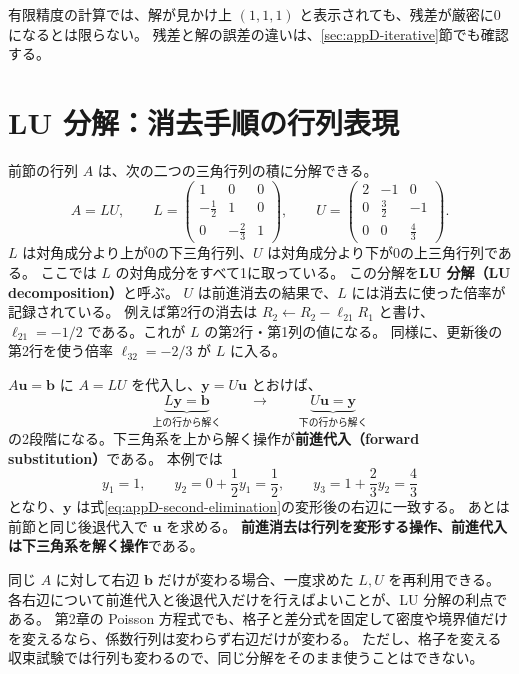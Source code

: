有限精度の計算では、解が見かけ上 $(1,1,1)$ と表示されても、残差が厳密に0になるとは限らない。
残差と解の誤差の違いは、\ref{sec:appD-iterative}節でも確認する。

\section{LU 分解：消去手順の行列表現}
\label{sec:appD-lu}

前節の行列 $A$ は、次の二つの三角行列の積に分解できる。
\begin{equation}
 \boxed{A=LU},\qquad
 L=\begin{pmatrix}1&0&0\\-\frac12&1&0\\0&-\frac23&1\end{pmatrix},\qquad
 U=\begin{pmatrix}2&-1&0\\0&\frac32&-1\\0&0&\frac43\end{pmatrix}.
\label{eq:appD-lu}
\end{equation}
$L$ は対角成分より上が0の下三角行列、$U$ は対角成分より下が0の上三角行列である。
ここでは $L$ の対角成分をすべて1に取っている。
この分解を\textbf{LU 分解（LU decomposition）}と呼ぶ。
$U$ は前進消去の結果で、$L$ には消去に使った倍率が記録されている。
例えば第2行の消去は $R_2\leftarrow R_2-\ell_{21}R_1$ と書け、
$\ell_{21}=-1/2$ である。これが $L$ の第2行・第1列の値になる。
同様に、更新後の第2行を使う倍率 $\ell_{32}=-2/3$ が $L$ に入る。

$A\boldsymbol u=\boldsymbol b$ に $A=LU$ を代入し、$\boldsymbol y=U\boldsymbol u$ とおけば、
\begin{equation}
 \underbrace{L\boldsymbol y=\boldsymbol b}_{\text{上の行から解く}}
 \qquad\longrightarrow\qquad
 \underbrace{U\boldsymbol u=\boldsymbol y}_{\text{下の行から解く}}
\label{eq:appD-triangular-solves}
\end{equation}
の2段階になる。下三角系を上から解く操作が\textbf{前進代入（forward substitution）}である。
本例では
\begin{equation}
 y_1=1,\qquad
 y_2=0+\frac12y_1=\frac12,\qquad
 y_3=1+\frac23y_2=\frac43
\label{eq:appD-forward-substitution}
\end{equation}
となり、$\boldsymbol y$ は式\eqref{eq:appD-second-elimination}の変形後の右辺に一致する。
あとは前節と同じ後退代入で $\boldsymbol u$ を求める。
\textbf{前進消去は行列を変形する操作、前進代入は下三角系を解く操作}である。

同じ $A$ に対して右辺 $\boldsymbol b$ だけが変わる場合、一度求めた $L,U$ を再利用できる。
各右辺について前進代入と後退代入だけを行えばよいことが、LU 分解の利点である\cite{kouya2021}。
第2章の Poisson 方程式でも、格子と差分式を固定して密度や境界値だけを変えるなら、係数行列は変わらず右辺だけが変わる。
ただし、格子を変える収束試験では行列も変わるので、同じ分解をそのまま使うことはできない。

